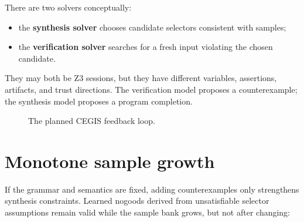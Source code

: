 \documentclass[10pt,letterpaper,oneside]{report}
\newcommand{\Lean}{Lean~4}
\newcommand{\term}[1]{\textbf{#1}}
\begin{document}
There are two solvers conceptually:

\begin{itemize}
\item the \term{synthesis solver} chooses candidate selectors consistent with samples;
\item the \term{verification solver} searches for a fresh input violating the chosen candidate.
\end{itemize}

They may both be Z3 sessions, but they have different variables, assertions, artifacts, and trust directions. The verification model proposes a counterexample; the synthesis model proposes a program completion.

\begin{figure}[htbp]
\centering
{}
\caption{The planned CEGIS feedback loop.}
\label{fig:cegis}
\end{figure}

\section{Monotone sample growth}

If the grammar and semantics are fixed, adding counterexamples only strengthens synthesis constraints. Learned nogoods derived from unsatisfiable selector assumptions remain valid while the sample bank grows, but not after changing:
\end{document}
